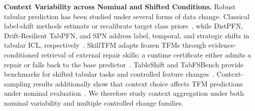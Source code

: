 \medskip
\noindent\textbf{Context Variability across Nominal and Shifted Conditions.}
Robust tabular prediction has been studied under several forms of data change.
Classical label-shift methods estimate or recalibrate target class
priors~\citep{lipton2018bbse,alexandari2020labelshift}, while DistPFN,
Drift-Resilient TabPFN, and SPN address label, temporal, and strategic shifts in
tabular ICL, respectively~\citep{lee2026distpfn,helli2024drifttabpfn,
lv2026strategic}. SkillTFM adapts frozen TFMs through evidence-conditioned
retrieval of external repair skills; a runtime certificate either admits a
repair or falls back to the base predictor~\citep{he2026skilltfm}. TableShift
and TabFSBench provide benchmarks for shifted
tabular tasks and controlled feature changes~\citep{gardner2023tableshift,
cheng2025tabfsbench}. Context-sampling results additionally show that context
choice affects TFM predictions under nominal
evaluation~\citep{abdullah2026contextsampling}. We therefore study context
aggregation under both nominal variability and multiple controlled change
families.
